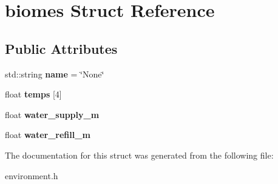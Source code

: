 \hypertarget{structbiomes}{}\section{biomes Struct Reference}
\label{structbiomes}
\subsection*{Public Attributes}
\begin{DoxyCompactItemize}
\item 
\mbox{\label{structbiomes_ad8d4f5a2f2517ee0abc36f88d1185ba6}} 
std\+::string {\bfseries name} = \char`\"{}None\char`\"{}
\item 
\mbox{\label{structbiomes_a17e93b968367b3471c562b1b988842d0}} 
float {\bfseries temps} \mbox{[}4\mbox{]}
\item 
\mbox{\label{structbiomes_acc7eb0f6fe3fb32de7112b2adff85da6}} 
float {\bfseries water\+\_\+supply\+\_\+m}
\item 
\mbox{\label{structbiomes_a292c444c37526e19d061c062723b5d52}} 
float {\bfseries water\+\_\+refill\+\_\+m}
\end{DoxyCompactItemize}


The documentation for this struct was generated from the following file\+:\begin{DoxyCompactItemize}
\item 
environment.\+h\end{DoxyCompactItemize}
